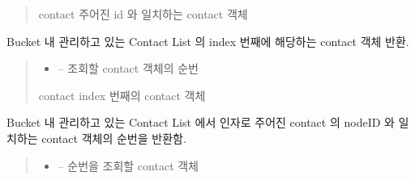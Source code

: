 \documentclass[a4paper,10pt,english]{sphinxmanual}
\begin{document}
\begin{fulllineitems}
\begin{fulllineitems}
\begin{quote}
\begin{description}
\sphinxAtStartPar
contact \sphinxhyphen{} 주어진 id 와 일치하는 contact 객체

\end{description}\end{quote}

\end{fulllineitems}


\begin{fulllineitems}
\label{\detokenize{_kademlia:Bucket.get}}
\pysigstartsignatures
{}
\pysigstopsignatures
\sphinxAtStartPar
Bucket 내 관리하고 있는 Contact List 의 index 번째에 해당하는 contact 객체 반환.
\begin{quote}\begin{description}
\begin{itemize}
\item {} 
\sphinxAtStartPar
{} – 조회할 contact 객체의 순번

\end{itemize}

\sphinxAtStartPar
contact \sphinxhyphen{} index 번째의 contact 객체

\end{description}\end{quote}

\end{fulllineitems}


\begin{fulllineitems}
\label{\detokenize{_kademlia:Bucket.indexOf}}
\pysigstartsignatures
{}
\pysigstopsignatures
\sphinxAtStartPar
Bucket 내 관리하고 있는 Contact List 에서 인자로 주어진 contact 의 nodeID 와 일치하는 contact 객체의 순번을 반환함.
\begin{quote}\begin{description}
\begin{itemize}
\item {} 
\sphinxAtStartPar
{} – 순번을 조회할 contact 객체


\end{itemize}
\end{description}
\end{quote}
\end{fulllineitems}
\end{fulllineitems}
\end{document}
